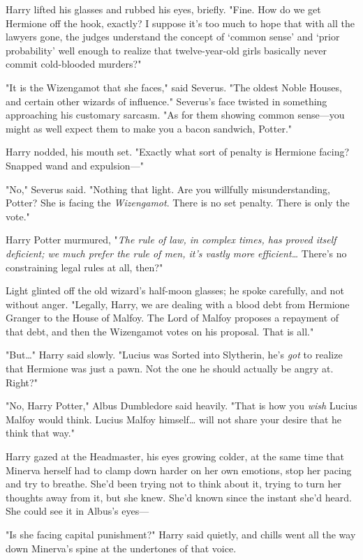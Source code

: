 Harry lifted his glasses and rubbed his eyes, briefly. "Fine. How do we get
Hermione off the hook, exactly? I suppose it's too much to hope that with all
the lawyers gone, the judges understand the concept of `common sense' and
`prior probability' well enough to realize that twelve-year-old girls basically
never commit cold-blooded murders?"

"It is the Wizengamot that she faces," said Severus. "The oldest Noble Houses,
and certain other wizards of influence." Severus's face twisted in something
approaching his customary sarcasm. "As for them showing common sense---you
might as well expect them to make you a bacon sandwich, Potter."

Harry nodded, his mouth set. "Exactly what sort of penalty is Hermione facing?
Snapped wand and expulsion---"

"No," Severus said. "Nothing that light. Are you willfully misunderstanding,
Potter? She is facing the \emph{Wizengamot}. There is no set penalty. There is
only the vote."

Harry Potter murmured, "\emph{The rule of law, in complex times, has proved
itself deficient; we much prefer the rule of men, it's vastly more
efficient{\ldots}} There's no constraining legal rules at all, then?"

Light glinted off the old wizard's half-moon glasses; he spoke carefully, and
not without anger. "Legally, Harry, we are dealing with a blood debt from
Hermione Granger to the House of Malfoy. The Lord of Malfoy proposes a
repayment of that debt, and then the Wizengamot votes on his proposal. That is
all."

"But{\ldots}" Harry said slowly. "Lucius was Sorted into Slytherin, he's
\emph{got} to realize that Hermione was just a pawn. Not the one he should
actually be angry at. Right?"

"No, Harry Potter," Albus Dumbledore said heavily. "That is how you \emph{wish}
Lucius Malfoy would think. Lucius Malfoy himself{\ldots} will not share your
desire that he think that way."

Harry gazed at the Headmaster, his eyes growing colder, at the same time that
Minerva herself had to clamp down harder on her own emotions, stop her pacing
and try to breathe. She'd been trying not to think about it, trying to turn her
thoughts away from it, but she knew. She'd known since the instant she'd heard.
She could see it in Albus's eyes---

"Is she facing capital punishment?" Harry said quietly, and chills went all the
way down Minerva's spine at the undertones of that voice.

